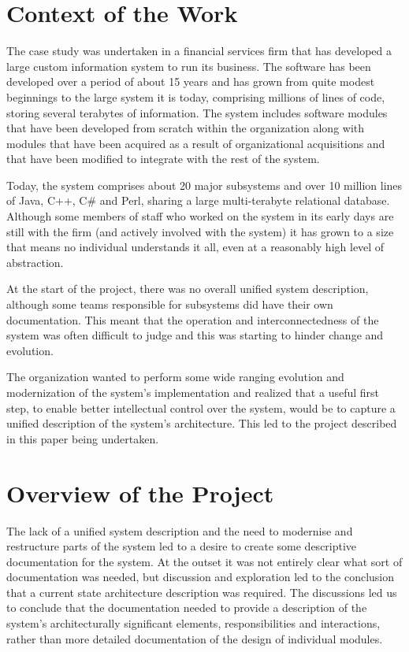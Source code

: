   \section{Context of the Work}

  The case study was undertaken in a financial services firm that has developed a large custom information system to run its business.  The software has been developed over a period of about 15 years and has grown from quite modest beginnings to the large system it is today, comprising millions of lines of code, storing several terabytes of information.  The system includes software modules that have been developed from scratch within the organization along with modules that have been acquired as a result of organizational acquisitions and that have been modified to integrate with the rest of the system.

  Today, the system comprises about 20 major subsystems and over 10 million lines of Java, C++, C\# and Perl, sharing a large multi-terabyte relational database.  Although some members of staff who worked on the system in its early days are still with the firm (and actively involved with the system) it has grown to a size that means no individual understands it all, even at a reasonably high level of abstraction.

  At the start of the project, there was no overall unified system description, although some teams responsible for subsystems did have their own documentation. This meant that the operation and interconnectedness of the system was often difficult to judge and this was starting to hinder change and evolution.

  The organization wanted to perform some wide ranging evolution and modernization of the system's implementation and realized that a useful first step, to enable better intellectual control over the system, would be to capture a unified description of the system's architecture.  This led to the project described in this paper being undertaken.

\section{Overview of the Project}
\label{sec:overview}

  The lack of a unified system description and the need to modernise and restructure parts of the system led to a desire to create some descriptive documentation for the system.  At the outset it was not entirely clear what sort of documentation was needed, but discussion and exploration led to the conclusion that a current state architecture description was required.  The discussions led us to conclude that the documentation needed to provide a description of the system's architecturally significant elements, responsibilities and interactions, rather than more detailed documentation of the design of individual modules.

